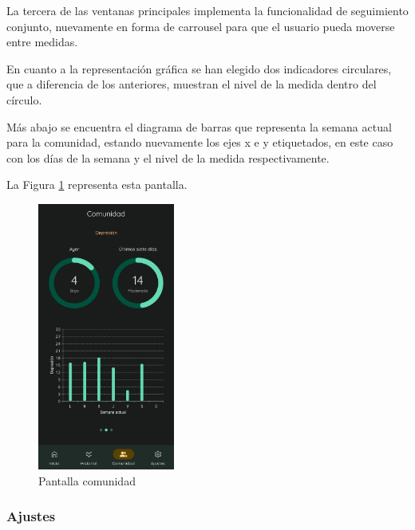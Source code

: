                 La tercera de las ventanas principales implementa la funcionalidad de seguimiento conjunto, nuevamente en forma de carrousel para que el usuario pueda moverse entre medidas.

                En cuanto a la representación gráfica se han elegido dos indicadores circulares, que a diferencia de los anteriores, muestran el nivel de la medida dentro del círculo. 
                
                Más abajo se encuentra el diagrama de barras que representa la semana actual para la comunidad, estando nuevamente los ejes x e y etiquetados, en este caso con los días de la semana y el nivel de la medida respectivamente.

                La Figura \ref{figure:implementacion:pantalla:comunidad} representa esta pantalla.
                
                \begin{figure}[h]
                	\centering
                	\includegraphics[width=0.4\textwidth]{figures/pantallas/Comunidad.png}
                	\caption{Pantalla comunidad}
                	\label{figure:implementacion:pantalla:comunidad}
                \end{figure}
                
                \clearpage  %
            \subsubsection*{Ajustes}

